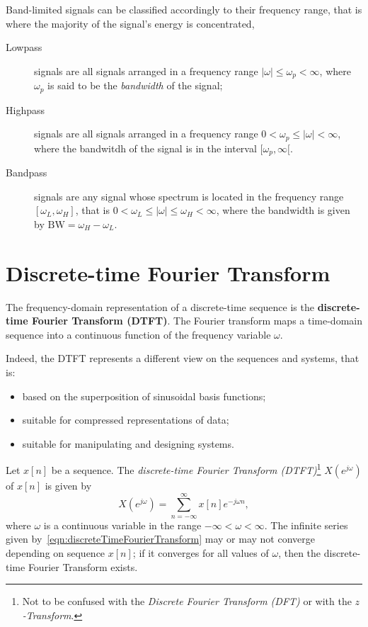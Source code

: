 \documentclass[\documentfontsize, twocolumn]{\classname}
\begin{document}
Band-limited signals can be classified accordingly to their frequency range, that is where the majority of the signal's energy is concentrated,
\begin{description}
    \item[Lowpass] signals are all signals arranged in a frequency range $|\omega| \leq \omega_p < \infty$, where $\omega_p$ is said to be the \emph{bandwidth} of the signal;
    \item[Highpass] signals are all signals arranged in a frequency range $0 < \omega_p \leq |\omega| < \infty$, where the bandwitdh of the signal is in the interval $[\omega_p, \infty[$.
    \item[Bandpass] signals are any signal whose spectrum is located in the frequency range $[\omega_L, \omega_H]$, that is $0 < \omega_L \leq |\omega| \leq \omega_H < \infty$, where the bandwidth is given by $\mathrm{BW} = \omega_H - \omega_L$.
\end{description}

\section{Discrete-time Fourier Transform}\label{sec:discreteTimeFourierTransform}
The frequency-domain representation of a discrete-time sequence is the \textbf{discrete-time Fourier Transform (DTFT)}. The Fourier transform maps a time-domain sequence into a continuous function of the frequency variable $\omega$.

Indeed, the DTFT represents a different view on the sequences and systems, that is:
\begin{itemize}
    \item based on the superposition of sinusoidal basis functions;
    \item suitable for compressed representations of data;
    \item suitable for manipulating and designing systems.
\end{itemize}

\begin{defin}
    Let $x[n]$ be a sequence. The \emph{discrete-time Fourier Transform (DTFT)}\footnote{Not to be confused with the \emph{Discrete Fourier Transform (DFT)} or with the \emph{$z$-Transform}.} $X(e^{j\omega})$ of $x[n]$ is given by
    \begin{equation}\label{eqn:discreteTimeFourierTransform}
        X(e^{j\omega}) = \sum_{n=-\infty}^\infty x[n] e^{-j\omega n},
    \end{equation}
    where $\omega$ is a continuous variable in the range $-\infty < \omega < \infty$.
The infinite series given by~\ref{eqn:discreteTimeFourierTransform} may or may not converge depending on sequence $x[n]$; if it converges for all values of $\omega$, then the discrete-time Fourier Transform exists.
\end{defin}
\end{document}
